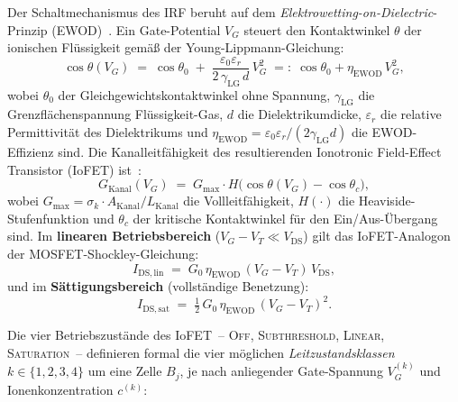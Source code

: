 \documentclass[12pt, a4paper, openany]{report}
\begin{document}
Der Schaltmechanismus des IRF beruht auf dem
\emph{Elektrowetting-on-Dielectric}-Prinzip (EWOD)~\cite{epp2026iono}.
Ein Gate-Potential $V_G$ steuert den Kontaktwinkel $\theta$ der ionischen
Flüssigkeit gemäß der Young-Lippmann-Gleichung:
\begin{equation}
  \label{eq:iono_ewod}
  \cos\theta(V_G) \;=\; \cos\theta_0
  \;+\; \frac{\varepsilon_0 \varepsilon_r}{2\,\gamma_{\mathrm{LG}}\,d}\,V_G^2
  \;=:\; \cos\theta_0 + \eta_{\mathrm{EWOD}}\,V_G^2,
\end{equation}
wobei $\theta_0$ der Gleichgewichtskontaktwinkel ohne Spannung,
$\gamma_{\mathrm{LG}}$ die Grenzflächenspannung Flüssigkeit-Gas,
$d$ die Dielektrikumdicke, $\varepsilon_r$ die relative Permittivität des
Dielektrikums und $\eta_{\mathrm{EWOD}} = \varepsilon_0\varepsilon_r/(2\gamma_{\mathrm{LG}}d)$
die EWOD-Effizienz sind.  Die Kanalleitfähigkeit des resultierenden
Ionotronic Field-Effect Transistor (IoFET) ist~\cite{epp2026iono}:
\begin{equation}
  \label{eq:iono_gkanal}
  G_{\mathrm{Kanal}}(V_G)
  \;=\; G_{\max} \cdot H\!\bigl(\cos\theta(V_G) - \cos\theta_c\bigr),
\end{equation}
wobei $G_{\max} = \sigma_k \cdot A_{\mathrm{Kanal}} / L_{\mathrm{Kanal}}$
die Vollleitfähigkeit, $H(\cdot)$ die Heaviside-Stufenfunktion und
$\theta_c$ der kritische Kontaktwinkel für den Ein/Aus-Übergang sind.
Im \textbf{linearen Betriebsbereich} ($V_G - V_T \ll V_\mathrm{DS}$)
gilt das IoFET-Analogon der MOSFET-Shockley-Gleichung:
\begin{equation}
  \label{eq:iono_linear}
  I_\mathrm{DS,lin} \;=\; G_0\,\eta_{\mathrm{EWOD}}\,(V_G - V_T)\,V_\mathrm{DS},
\end{equation}
und im \textbf{Sättigungsbereich} (vollständige Benetzung):
\begin{equation}
  \label{eq:iono_sat}
  I_\mathrm{DS,sat} \;=\; \tfrac{1}{2}\,G_0\,\eta_{\mathrm{EWOD}}\,(V_G - V_T)^2.
\end{equation}

Die vier Betriebszustände des IoFET~-- \textsc{Off}, \textsc{Sub\-threshold},
\textsc{Linear}, \textsc{Saturation}~-- definieren formal die vier möglichen
\emph{Leitzustandsklassen} $k \in \{1,2,3,4\}$ um eine Zelle $B_j$, je nach
anliegender Gate-Spannung $V_G^{(k)}$ und Ionenkonzentration $c^{(k)}$:
\end{document}
